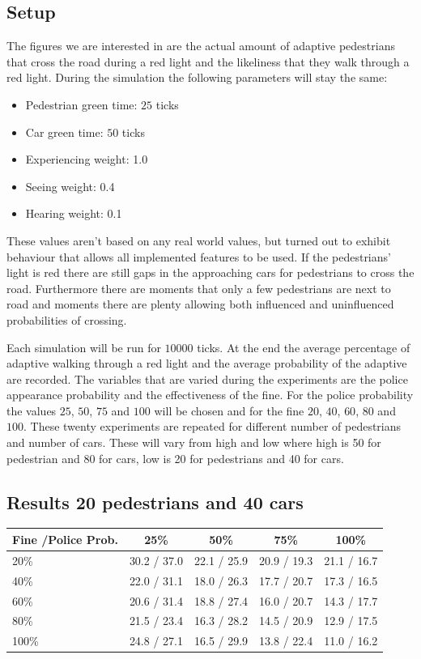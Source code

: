 \documentclass[a4paper]{article}
\begin{document}
\subsection{Setup}
The figures we are interested in are the actual amount of adaptive pedestrians that cross the road during a red light and the likeliness that they walk through a red light. During the simulation the following parameters will stay the same:
\begin{itemize}
\item Pedestrian green time: $25$ ticks
\item Car green time: $50$ ticks
\item Experiencing weight: 1.0
\item Seeing weight: 0.4
\item Hearing weight: 0.1
\end{itemize}
These values aren't based on any real world values, but turned out to exhibit behaviour that allows all implemented features to be used. If the pedestrians' light is red there are still gaps in the approaching cars for pedestrians to cross the road. Furthermore there are moments that only a few pedestrians are next to road and moments there are plenty allowing both influenced and uninfluenced probabilities of crossing. 

Each simulation will be run for $10000$ ticks. At the end the average percentage of adaptive walking through a red light and the average probability of the adaptive are recorded. The variables that are varied during the experiments are the police appearance probability and the effectiveness of the fine. For the police probability the values $25$, $50$, $75$ and $100$ will be chosen and for the fine $20$, $40$, $60$, $80$ and $100$. These twenty experiments are repeated for different number of pedestrians and number of cars. These will vary from high and low where high is 50 for pedestrian and 80 for cars, low is 20 for pedestrians and 40 for cars.

\clearpage
\subsection{Results 20 pedestrians and 40 cars}
\begin{table}[H]
\centering
\begin{tabular}{ l | c c c c }
  Fine \slash Police Prob. & 25\% & 50\% & 75\% & 100\% \\ 
  \hline
  20\%  & 30.2 / 37.0 & 22.1 / 25.9 & 20.9 / 19.3 & 21.1 / 16.7  \\
  40\%  & 22.0 / 31.1 & 18.0 / 26.3 & 17.7 / 20.7 & 17.3 / 16.5  \\
  60\%  & 20.6 / 31.4 & 18.8 / 27.4 & 16.0 / 20.7 & 14.3 / 17.7  \\
  80\%  & 21.5 / 23.4 & 16.3 / 28.2 & 14.5 / 20.9 & 12.9 / 17.5  \\
  100\% & 24.8 / 27.1 & 16.5 / 29.9 & 13.8 / 22.4 & 11.0 / 16.2  \\
\end{tabular}
\end{table}
\end{document}
